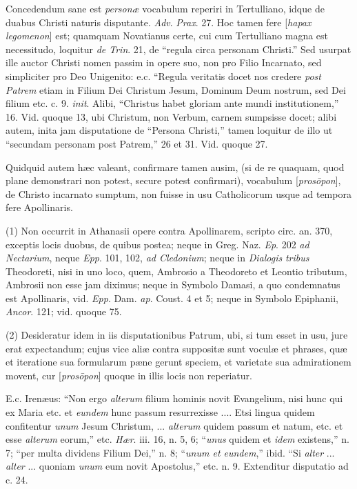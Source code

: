 Concedendum sane est \emph{personæ} vocabulum
reperiri in Tertulliano, idque de duabus Christi naturis disputante. \emph{Adv}.
\emph{Prax}. 27. Hoc tamen fere [\emph{hapax legomenon}] est; quamquam
Novatianus certe, cui cum Tertulliano magna est necessitudo, loquitur \emph{de
Trin}. 21, de ``regula circa personam Christi.'' Sed usurpat ille
auctor Christi nomen passim in opere suo, non pro Filio Incarnato, sed
simpliciter pro Deo Unigenito: e.c. ``Regula veritatis docet nos
credere \emph{post Patrem} etiam in Filium Dei Christum Jesum, Dominum
Deum nostrum, sed Dei filium etc. c. 9. \emph{init}. Alibi, ``Christus
habet gloriam ante mundi institutionem,'' 16. Vid. quoque 13, ubi
Christum, non Verbum, carnem sumpsisse docet; alibi autem, inita jam disputatione de ``Persona Christi,'' tamen loquitur de illo ut ``secundam
personam post Patrem,'' 26 et 31. Vid. quoque 27.

Quidquid autem hæc valeant, confirmare tamen
ausim, (si de re quaquam, quod plane demonstrari non potest, secure
potest confirmari), vocabulum [\emph{pros\={o}pon}], de Christo
incarnato sumptum, non fuisse in usu Catholicorum usque ad tempora
fere Apollinaris.

(1) Non occurrit in Athanasii opere contra
Apollinarem, scripto circ. an. 370, exceptis locis duobus, de quibus
postea; neque in Greg. Naz. \emph{Ep}. 202 \emph{ad Nectarium}, neque \emph{Epp}.
101, 102, \emph{ad Cledonium}; neque in \emph{Dialogis} \emph{tribus}
Theodoreti, nisi in uno loco, quem, Ambrosio a Theodoreto et Leontio
tributum, Ambrosii non esse jam diximus; neque in Symbolo Damasi, a
quo condemnatus est Apollinaris, vid. \emph{Epp}. Dam. \emph{ap}.
Coust. 4 et 5; neque in Symbolo Epiphanii, \emph{Ancor}. 121; vid.
quoque 75.

(2) Desideratur idem in iis disputationibus
Patrum, ubi, si tum esset in usu, jure erat expectandum; cujus vice
aliæ contra suppositæ sunt voculæ et phrases, quæ et iteratione
sua formularum pæne gerunt speciem, et varietate sua admirationem
movent, cur [\emph{pros\={o}pon}] quoque in illis locis non
reperiatur.

E.c. Irenæus: ``Non ergo \emph{alterum} filium
hominis novit Evangelium, nisi hunc qui ex Maria etc. et \emph{eundem}
hunc passum resurrexisse .... Etsi lingua quidem confitentur \emph{unum}
Jesum Christum, ... \emph{alterum} quidem passum et natum, etc. et
esse \emph{alterum} eorum,'' etc. \emph{Hær}. iii. 16, n. 5, 6; ``\emph{unus}
quidem et \emph{idem} existens,'' n. 7; ``per multa dividens Filium Dei,''
n. 8; ``\emph{unum et eundem},'' ibid. ``Si \emph{alter} ... \emph{alter}
... quoniam \emph{unum} eum novit Apostolus,'' etc. n. 9. Extenditur
disputatio ad c. 24.

